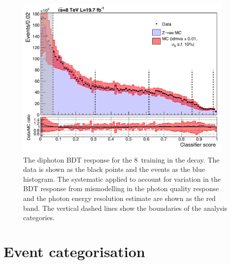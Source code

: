 \begin{figure}
  \includegraphics[width=0.95\textwidth]{selec_and_cats/plots/transformedBDT_single_syst_fix_fix.pdf}
  \caption[The diphoton \acs{BDT} response in \Zee decays]{The diphoton BDT response for the 8~\TeV training in the \Zee decay. The data is shown as the black points and the \MC events as the blue histogram. The systematic applied to account for variation in the BDT response from mismodelling in the photon quality response and the photon energy resolution estimate are shown as the red band. The vertical dashed lines show the boundaries of the analysis categories.}
  \label{fig:diphotonBDT_zee}
\end{figure}

\section{Event categorisation}
\label{sec:categorisation}

